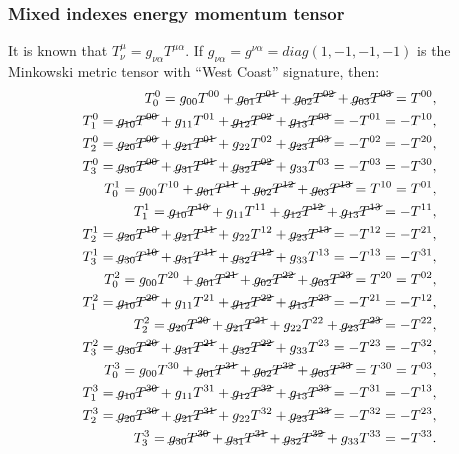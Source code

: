 \documentclass[12pt, a4paper]{article}
\begin{document}
\subsubsection{Mixed indexes energy momentum tensor} \label{mixed_Tmunu}
It is known that $T^{\mu}_{\nu}=g_{\nu\alpha}T^{\mu\alpha}$. If $g_{\nu\alpha}=g^{\nu\alpha}=diag(1,-1,-1,-1)$ is the Minkowski metric tensor with ``West Coast'' signature, then:
\begin{equation}
\begin{split}
T^0_0=g_{00}T^{00}+\cancel{g_{01}T^{01}}+\cancel{g_{02}T^{02}}+\cancel{g_{03}T^{03}}=T^{00},\\
T^0_1=\cancel{g_{10}T^{00}}+g_{11}T^{01}+\cancel{g_{12}T^{02}}+\cancel{g_{13}T^{03}}=-T^{01}=-T^{10},\\
T^0_2=\cancel{g_{20}T^{00}}+\cancel{g_{21}T^{01}}+g_{22}T^{02}+\cancel{g_{23}T^{03}}=-T^{02}=-T^{20},\\
T^0_3=\cancel{g_{30}T^{00}}+\cancel{g_{31}T^{01}}+\cancel{g_{32}T^{02}}+g_{33}T^{03}=-T^{03}=-T^{30},\\
T^1_0=g_{00}T^{10}+\cancel{g_{01}T^{11}}+\cancel{g_{02}T^{12}}+\cancel{g_{03}T^{13}}=T^{10}=T^{01},\\
T^1_1=\cancel{g_{10}T^{10}}+g_{11}T^{11}+\cancel{g_{12}T^{12}}+\cancel{g_{13}T^{13}}=-T^{11},\\
T^1_2=\cancel{g_{20}T^{10}}+\cancel{g_{21}T^{11}}+g_{22}T^{12}+\cancel{g_{23}T^{13}}=-T^{12}=-T^{21},\\
T^1_3=\cancel{g_{30}T^{10}}+\cancel{g_{31}T^{11}}+\cancel{g_{32}T^{12}}+g_{33}T^{13}=-T^{13}=-T^{31},\\
T^2_0=g_{00}T^{20}+\cancel{g_{01}T^{21}}+\cancel{g_{02}T^{22}}+\cancel{g_{03}T^{23}}=T^{20}=T^{02},\\
T^2_1=\cancel{g_{10}T^{20}}+g_{11}T^{21}+\cancel{g_{12}T^{22}}+\cancel{g_{13}T^{23}}=-T^{21}=-T^{12},\\
T^2_2=\cancel{g_{20}T^{20}}+\cancel{g_{21}T^{21}}+g_{22}T^{22}+\cancel{g_{23}T^{23}}=-T^{22},\\
T^2_3=\cancel{g_{30}T^{20}}+\cancel{g_{31}T^{21}}+\cancel{g_{32}T^{22}}+g_{33}T^{23}=-T^{23}=-T^{32},\\
T^3_0=g_{00}T^{30}+\cancel{g_{01}T^{31}}+\cancel{g_{02}T^{32}}+\cancel{g_{03}T^{33}}=T^{30}=T^{03},\\
T^3_1=\cancel{g_{10}T^{30}}+g_{11}T^{31}+\cancel{g_{12}T^{32}}+\cancel{g_{13}T^{33}}=-T^{31}=-T^{13},\\
T^3_2=\cancel{g_{20}T^{30}}+\cancel{g_{21}T^{31}}+g_{22}T^{32}+\cancel{g_{23}T^{33}}=-T^{32}=-T^{23},\\
T^3_3=\cancel{g_{30}T^{30}}+\cancel{g_{31}T^{31}}+\cancel{g_{32}T^{32}}+g_{33}T^{33}=-T^{33}.
\end{split}
\end{equation}
\end{document}
